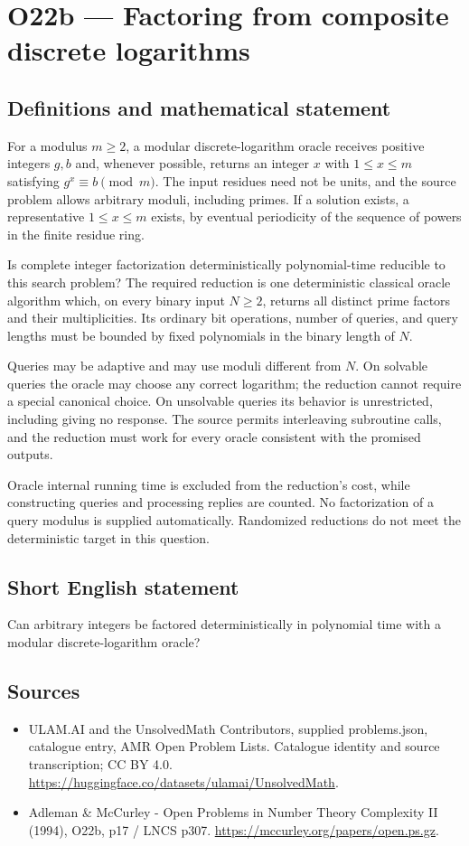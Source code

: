 \documentclass[11pt,a4paper]{article}
\begin{document}
\section*{O22b — Factoring from composite discrete logarithms}\label{statement}

\subsection{Definitions and mathematical statement}
For a modulus $m\ge2$, a modular discrete-logarithm oracle receives positive integers $g,b$ and, whenever possible, returns an integer $x$ with $1\le x\le m$ satisfying $g^x\equiv b\pmod m$. The input residues need not be units, and the source problem allows arbitrary moduli, including primes. If a solution exists, a representative $1\le x\le m$ exists, by eventual periodicity of the sequence of powers in the finite residue ring.

Is complete integer factorization deterministically polynomial-time reducible to this search problem? The required reduction is one deterministic classical oracle algorithm which, on every binary input $N\ge2$, returns all distinct prime factors and their multiplicities. Its ordinary bit operations, number of queries, and query lengths must be bounded by fixed polynomials in the binary length of $N$.

Queries may be adaptive and may use moduli different from $N$. On solvable queries the oracle may choose any correct logarithm; the reduction cannot require a special canonical choice. On unsolvable queries its behavior is unrestricted, including giving no response. The source permits interleaving subroutine calls, and the reduction must work for every oracle consistent with the promised outputs.

Oracle internal running time is excluded from the reduction's cost, while constructing queries and processing replies are counted. No factorization of a query modulus is supplied automatically. Randomized reductions do not meet the deterministic target in this question.
\subsection{Short English statement}
Can arbitrary integers be factored deterministically in polynomial time with a modular discrete-logarithm oracle?
\subsection{Sources}
\begin{itemize}
\item[S1] ULAM.AI and the UnsolvedMath Contributors, supplied problems.json, catalogue entry, AMR Open Problem Lists. Catalogue identity and source transcription; CC BY 4.0.
\url{https://huggingface.co/datasets/ulamai/UnsolvedMath}.
\item[S2] Adleman \& McCurley - Open Problems in Number Theory Complexity II (1994), O22b, p17 / LNCS p307. 
\url{https://mccurley.org/papers/open.ps.gz}.
\end{itemize}
\end{document}
